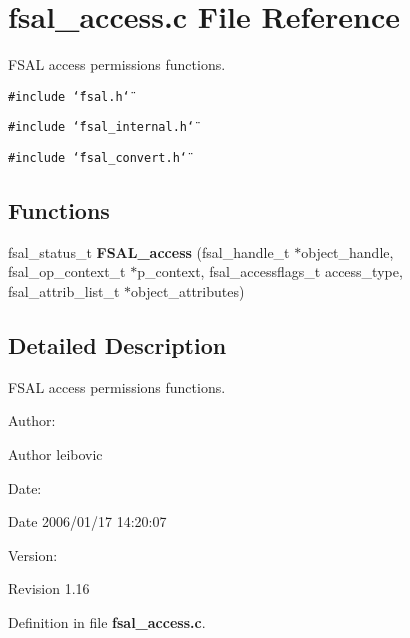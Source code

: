 \section{fsal\_\-access.c File Reference}
\label{fsal__access_8c}
FSAL access permissions functions. 

{\tt \#include \char`\"{}fsal.h\char`\"{}}\par
{\tt \#include \char`\"{}fsal\_\-internal.h\char`\"{}}\par
{\tt \#include \char`\"{}fsal\_\-convert.h\char`\"{}}\par
\subsection*{Functions}
\begin{CompactItemize}
\item 
fsal\_\-status\_\-t {\bf FSAL\_\-access} (fsal\_\-handle\_\-t $\ast$object\_\-handle, fsal\_\-op\_\-context\_\-t $\ast$p\_\-context, fsal\_\-accessflags\_\-t access\_\-type, fsal\_\-attrib\_\-list\_\-t $\ast$object\_\-attributes)
\end{CompactItemize}


\subsection{Detailed Description}
FSAL access permissions functions. 

\begin{Desc}
\item[Author:]\begin{Desc}
\item[Author]leibovic \end{Desc}
\end{Desc}
\begin{Desc}
\item[Date:]\begin{Desc}
\item[Date]2006/01/17 14:20:07 \end{Desc}
\end{Desc}
\begin{Desc}
\item[Version:]\begin{Desc}
\item[Revision]1.16 \end{Desc}
\end{Desc}


Definition in file {\bf fsal\_\-access.c}.

